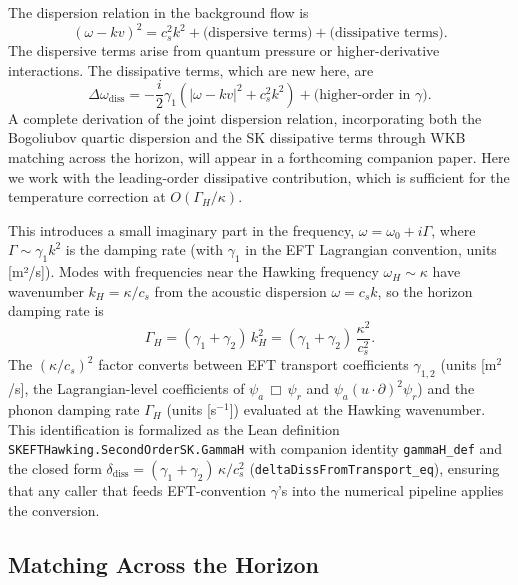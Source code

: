 \documentclass[aps,prl,twocolumn,superscriptaddress,nofootinbib,amsmath,amssymb]{revtex4-2}
\begin{document}
The dispersion relation in the background flow is
\begin{equation}
\label{eq:dispersion_relation}
(\omega - k v)^2 = c_s^2 k^2 + \text{(dispersive terms)} + \text{(dissipative terms)}.
\end{equation}
The dispersive terms arise from quantum pressure or higher-derivative interactions. The dissipative terms, which are new here, are
\begin{equation}
\label{eq:dissipative_dispersion}
\Delta \omega_{\text{diss}} = -\frac{i}{2}\gamma_1 (|\omega - kv|^2 + c_s^2 k^2) + \text{(higher-order in } \gamma \text{)}.
\end{equation}
A complete derivation of the joint dispersion relation, incorporating both the Bogoliubov quartic dispersion and the SK dissipative terms through WKB matching across the horizon, will appear in a forthcoming companion paper. Here we work with the leading-order dissipative contribution, which is sufficient for the temperature correction at $O(\Gamma_H/\kappa)$.

This introduces a small imaginary part in the frequency, $\omega = \omega_0 + i\Gamma$, where $\Gamma \sim \gamma_1 k^2$ is the damping rate (with $\gamma_1$ in the EFT Lagrangian convention, units [m²/s]). Modes with frequencies near the Hawking frequency $\omega_H \sim \kappa$ have wavenumber $k_H = \kappa/c_s$ from the acoustic dispersion $\omega = c_s k$, so the horizon damping rate is
\begin{equation}
\label{eq:hawking_damping}
\Gamma_H = (\gamma_1 + \gamma_2)\, k_H^2 = (\gamma_1 + \gamma_2)\,\frac{\kappa^2}{c_s^2}.
\end{equation}
The \mbox{$(\kappa/c_s)^2$} factor converts between EFT transport coefficients
$\gamma_{1,2}$ (units [m$^2$/s], the Lagrangian-level coefficients of
$\psi_a\,\Box\,\psi_r$ and $\psi_a (u\cdot\partial)^2 \psi_r$) and the
phonon damping rate $\Gamma_H$ (units [s$^{-1}$]) evaluated at the Hawking
wavenumber. This identification is formalized as the Lean definition
\texttt{SKEFTHawking.SecondOrderSK.GammaH} with companion identity
\texttt{gammaH\_def} and the closed form
$\delta_{\mathrm{diss}} = (\gamma_1+\gamma_2)\,\kappa/c_s^2$
(\texttt{deltaDissFromTransport\_eq}), ensuring that any caller that
feeds EFT-convention $\gamma$'s into the numerical pipeline applies the
conversion.

\subsection{Matching Across the Horizon}
\end{document}

